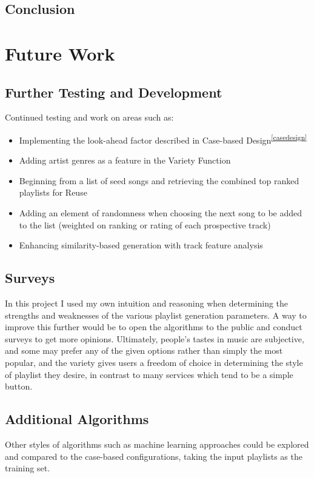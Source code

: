 \documentclass[a4paper, 12pt]{report}
\begin{document}
\section{Conclusion}


\chapter{Future Work}
\section{Further Testing and Development}
Continued testing and work on areas such as:
\begin{itemize}
    \item Implementing the look-ahead factor described in Case-based Design\textsuperscript{\ref{casedesign}}
    \item Adding artist genres as a feature in the Variety Function
    \item Beginning from a list of seed songs and retrieving the combined top ranked playlists for Reuse
    \item Adding an element of randomness when choosing the next song to be added to the list (weighted on ranking or rating of each prospective track)
    \item Enhancing similarity-based generation with track feature analysis
\end{itemize}

\section{Surveys}
In this project I used my own intuition and reasoning when determining the strengths and weaknesses of the various playlist generation parameters.
A way to improve this further would be to open the algorithms to the public and conduct surveys to get more opinions. Ultimately, people's tastes in music
are subjective, and some may prefer any of the given options rather than simply the most popular, and the variety gives users a freedom of choice in
determining the style of playlist they desire, in contrast to many services which tend to be a simple button.

\section{Additional Algorithms}
Other styles of algorithms such as machine learning approaches could be explored and compared to the case-based configurations, taking the input playlists as the training set.
\end{document}
